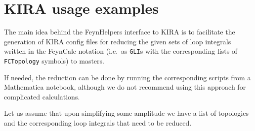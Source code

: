 \documentclass[../FeynHelpersManual.tex]{subfiles}
\begin{document}
\hypertarget{kira usage examples}{
\section{KIRA usage examples}\label{kira usage examples}}

The main idea behind the FeynHelpers interface to KIRA is to facilitate
the generation of KIRA config files for reducing the given sets of loop
integrals written in the FeynCalc notation (i.e.~as \texttt{GLI}s with
the corresponding lists of \texttt{FCTopology} symbols) to masters.

If needed, the reduction can be done by running the corresponding
scripts from a Mathematica notebook, although we do not recommend using
this approach for complicated calculations.

Let us assume that upon simplifying some amplitude we have a list of
topologies and the corresponding loop integrals that need to be reduced.

\begin{Shaded}
\begin{Highlighting}[]
\ExtensionTok{=} \OperatorTok{\{}\OperatorTok{[}\OperatorTok{,} \OperatorTok{\{}\OperatorTok{[\{\{}\OperatorTok{,} \OperatorTok{\},} \OperatorTok{\{}\OperatorTok{,} \OperatorTok{\},} \OperatorTok{\}],}\OperatorTok{[\{\{}\OperatorTok{,} \OperatorTok{\},} \OperatorTok{\{}\OperatorTok{,} \OperatorTok{\},} \OperatorTok{\}],}\OperatorTok{[\{\{}\SpecialCharTok{+}\OperatorTok{,} \OperatorTok{\},} \OperatorTok{\{}\OperatorTok{,} \OperatorTok{\},} \OperatorTok{\}],}\OperatorTok{[\{\{} \SpecialCharTok{+}\OperatorTok{,} \OperatorTok{\},} \OperatorTok{\{}\OperatorTok{,} \OperatorTok{\},} \OperatorTok{\}],}\OperatorTok{[\{\{} \SpecialCharTok{{-}}\OperatorTok{,} \OperatorTok{\},} \OperatorTok{\{}\OperatorTok{,} \OperatorTok{\},} \OperatorTok{\}]\},} \OperatorTok{\{}\OperatorTok{,}\OperatorTok{\},} \OperatorTok{\{}\OperatorTok{\},} \OperatorTok{\{}\OperatorTok{[}\OperatorTok{][}\OperatorTok{[}\OperatorTok{,} \OperatorTok{],}\OperatorTok{[}\OperatorTok{,} \OperatorTok{]]} \OtherTok{{-}\textgreater{}}\OperatorTok{\},} \OperatorTok{\{\}]\}}\NormalTok{;}
\end{Highlighting}
\end{Shaded}
\end{document}
